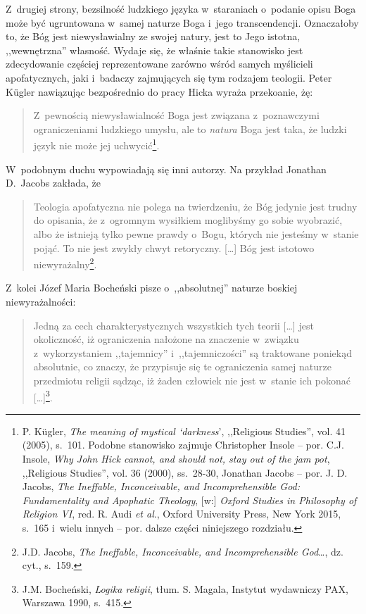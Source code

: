 Z~drugiej strony, bezsilność ludzkiego języka w~staraniach o~podanie opisu Boga może być ugruntowana w~samej naturze Boga i~jego transcendencji. Oznaczałoby to, że Bóg jest niewysławialny ze swojej natury, jest to Jego istotna, ,,wewnętrzna'' własność. Wydaje się, że właśnie takie stanowisko jest zdecydowanie częściej reprezentowane zarówno wśród samych myślicieli apofatycznych, jaki i~badaczy zajmujących się tym rodzajem teologii. Peter Kügler nawiązując bezpośrednio do pracy Hicka wyraża przekoanie, żę:

\begin{quote}
Z~pewnością niewysławialność Boga jest związana z~poznawczymi ograniczeniami ludzkiego umysłu, ale to \textit{natura} Boga jest taka, że ludzki język nie może jej uchwycić\footnote{P. Kügler, \textit{The meaning of mystical ‘darkness}', ,,Religious Studies'', vol. 41 (2005), s.~101. Podobne stanowisko zajmuje Christopher Insole -- por. C.J. Insole, \textit{Why John Hick cannot, and should not, stay out of the jam pot}, ,,Religious Studies'', vol. 36 (2000), ss.~28-30, Jonathan Jacobs -- por. J. D. Jacobs, \textit{The Ineffable, Inconceivable, and Incomprehensible God: Fundamentality and Apophatic Theology}, [w:] \textit{Oxford Studies in Philosophy of Religion VI}, red. R. Audi \textit{et al}., Oxford University Press, New York 2015, s.~165 i~wielu innych -- por. dalsze części niniejszego rozdziału.}.
\end{quote}

W~podobnym duchu wypowiadają się inni autorzy. Na przykład Jonathan D.~Jacobs zakłada, że

\begin{quote}
Teologia apofatyczna nie polega na twierdzeniu, że Bóg jedynie jest trudny do opisania, że z~ogromnym wysiłkiem moglibyśmy go sobie wyobrazić, albo że istnieją tylko pewne prawdy o~Bogu, których nie jesteśmy w~stanie pojąć. To nie jest zwykły chwyt retoryczny. [\ldots] Bóg jest istotowo niewyrażalny\footnote{J.D. Jacobs, \textit{The Ineffable, Inconceivable, and Incomprehensible God}\ldots, dz. cyt., s.~159.}.
\end{quote}
Z~kolei Józef Maria Bocheński pisze o~,,absolutnej'' naturze boskiej niewyrażalności:

\begin{quote}
Jedną za cech charakterystycznych wszystkich tych teorii [\ldots] jest okoliczność, iż ograniczenia nałożone na znaczenie w~związku z~wykorzystaniem ,,tajemnicy'' i~,,tajemniczości'' są traktowane poniekąd absolutnie, co znaczy, że przypisuje się te ograniczenia samej naturze przedmiotu religii sądząc, iż żaden człowiek nie jest w~stanie ich pokonać [\ldots]\footnote{J.M. Bocheński, \textit{Logika religii}, tłum. S. Magala, Instytut wydawniczy PAX, Warszawa 1990, s.~415.}.
\end{quote}

